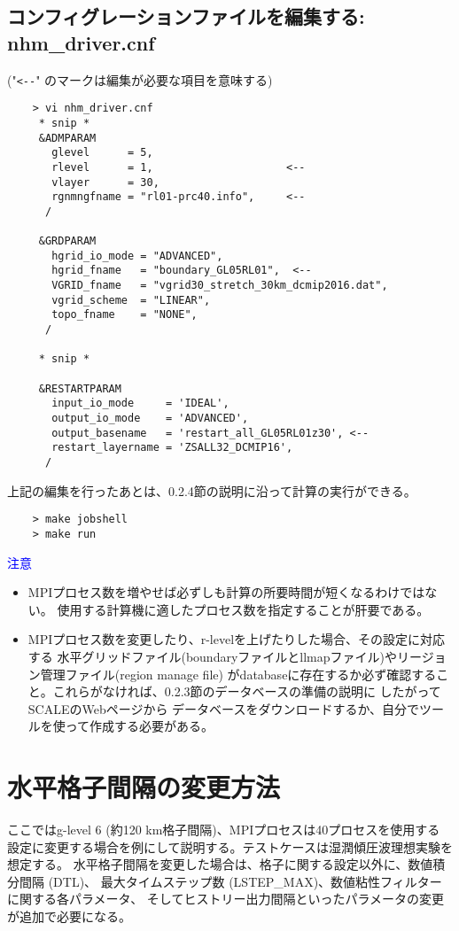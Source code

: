 \subsection{コンフィグレーションファイルを編集する: nhm\_driver.cnf}
 ("\verb|<--|" のマークは編集が必要な項目を意味する)
 \begin{verbatim}
    > vi nhm_driver.cnf
     * snip *
     &ADMPARAM
       glevel      = 5,
       rlevel      = 1,                     <--
       vlayer      = 30,
       rgnmngfname = "rl01-prc40.info",     <--
      /

     &GRDPARAM
       hgrid_io_mode = "ADVANCED",
       hgrid_fname   = "boundary_GL05RL01",  <--
       VGRID_fname   = "vgrid30_stretch_30km_dcmip2016.dat",
       vgrid_scheme  = "LINEAR",
       topo_fname    = "NONE",
      /

     * snip *

     &RESTARTPARAM
       input_io_mode     = 'IDEAL',
       output_io_mode    = 'ADVANCED',
       output_basename   = 'restart_all_GL05RL01z30', <--
       restart_layername = 'ZSALL32_DCMIP16',
      /
 \end{verbatim}

 \noindent 上記の編集を行ったあとは、0.2.4節の説明に沿って計算の実行ができる。
 \begin{verbatim}
    > make jobshell
    > make run
 \end{verbatim}

 \noindent \textcolor{blue}{{\sf 注意}}
 \begin{itemize}
   \item MPIプロセス数を増やせば必ずしも計算の所要時間が短くなるわけではない。
           使用する計算機に適したプロセス数を指定することが肝要である。
   \item MPIプロセス数を変更したり、r-levelを上げたりした場合、その設定に対応する
           水平グリッドファイル(boundaryファイルとllmapファイル)やリージョン管理ファイル(region manage file)
           がdatabaseに存在するか必ず確認すること。これらがなければ、0.2.3節のデータベースの準備の説明に
           したがってSCALEのWebページから
           データベースをダウンロードするか、自分でツールを使って作成する必要がある。
 \end{itemize}




\section{水平格子間隔の変更方法}
 \noindent ここではg-level 6 (約120 km格子間隔)、MPIプロセスは40プロセスを使用する
設定に変更する場合を例にして説明する。テストケースは湿潤傾圧波理想実験を想定する。
水平格子間隔を変更した場合は、格子に関する設定以外に、数値積分間隔 (DTL)、
最大タイムステップ数 (LSTEP\_MAX)、数値粘性フィルターに関する各パラメータ、
そしてヒストリー出力間隔といったパラメータの変更が追加で必要になる。

